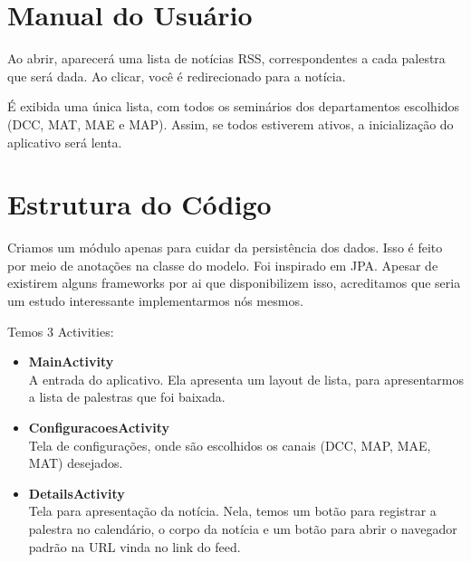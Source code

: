 




\cabecalho

\section{Manual do Usuário}
Ao abrir, aparecerá uma lista de notícias RSS, correspondentes a cada
palestra que será dada. Ao clicar, você é redirecionado para a notícia.

É exibida uma única lista, com todos os seminários dos departamentos
escolhidos (DCC, MAT, MAE e MAP). Assim, se todos estiverem ativos, a
inicialização do aplicativo será lenta.


\section{Estrutura do Código}
Criamos um módulo apenas para cuidar da persistência dos dados. Isso é feito
por meio de anotações na classe do modelo. Foi inspirado em JPA. Apesar de
existirem alguns frameworks por ai que disponibilizem isso, acreditamos que
seria um estudo interessante implementarmos nós mesmos.

Temos 3 Activities:
\begin{itemize}
    \item \textbf{MainActivity}\\
A entrada do aplicativo. Ela
apresenta um layout de lista, para apresentarmos a lista de palestras
que foi baixada.
    \item \textbf{ConfiguracoesActivity} \\
Tela de configurações, onde são escolhidos os canais (DCC, MAP, MAE, MAT)
desejados.
    \item \textbf{DetailsActivity}\\
Tela para apresentação da notícia. Nela, temos um botão para registrar a 
palestra no calendário, o corpo da notícia e um botão para abrir o navegador
padrão na URL vinda no link do feed.
\end{itemize}


